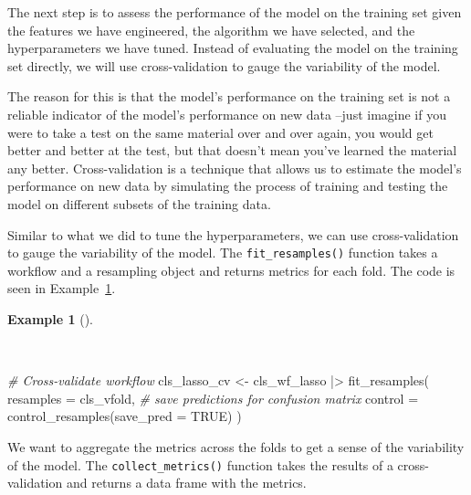 \documentclass[
  letterpaper,
]{latex/krantz}
\newenvironment{Shaded}{\begin{snugshade}}{\end{snugshade}}
\newcommand{\AttributeTok}[1]{\textcolor[rgb]{0.00,0.00,0.00}{#1}}
\newcommand{\CommentTok}[1]{\textcolor[rgb]{0.00,0.00,0.00}{\textit{#1}}}
\newcommand{\ConstantTok}[1]{\textcolor[rgb]{0.00,0.00,0.00}{#1}}
\newcommand{\FunctionTok}[1]{\textcolor[rgb]{0.00,0.00,0.00}{#1}}
\newcommand{\NormalTok}[1]{\textcolor[rgb]{0.00,0.00,0.00}{#1}}
\newcommand{\OtherTok}[1]{\textcolor[rgb]{0.00,0.00,0.00}{#1}}
\newcommand{\SpecialCharTok}[1]{\textcolor[rgb]{0.00,0.00,0.00}{#1}}
\theoremstyle{definition}
\newtheorem{example}{Example}[chapter]
\theoremstyle{remark}
\begin{document}
The next step is to assess the performance of the model on the training
set given the features we have engineered, the algorithm we have
selected, and the hyperparameters we have tuned. Instead of evaluating
the model on the training set directly, we will use cross-validation to
gauge the variability of the model.

The reason for this is that the model's performance on the training set
is not a reliable indicator of the model's performance on new data
--just imagine if you were to take a test on the same material over and
over again, you would get better and better at the test, but that
doesn't mean you've learned the material any better. Cross-validation is
a technique that allows us to estimate the model's performance on new
data by simulating the process of training and testing the model on
different subsets of the training data.

Similar to what we did to tune the hyperparameters, we can use
cross-validation to gauge the variability of the model. The
\texttt{fit\_resamples()} function takes a workflow and a resampling
object and returns metrics for each fold. The code is seen in
Example~\ref{exm-pda-class-tune-hyperparameters-evaluate-workflow-cv}.

\begin{example}[]\protect\hypertarget{exm-pda-class-tune-hyperparameters-evaluate-workflow-cv}{}\label{exm-pda-class-tune-hyperparameters-evaluate-workflow-cv}

~

\begin{Shaded}
\begin{Highlighting}[]
\CommentTok{\# Cross{-}validate workflow}
\NormalTok{cls\_lasso\_cv }\OtherTok{\textless{}{-}}
\NormalTok{  cls\_wf\_lasso }\SpecialCharTok{|\textgreater{}}
  \FunctionTok{fit\_resamples}\NormalTok{(}
    \AttributeTok{resamples =}\NormalTok{ cls\_vfold,}
    \CommentTok{\# save predictions for confusion matrix}
    \AttributeTok{control =} \FunctionTok{control\_resamples}\NormalTok{(}\AttributeTok{save\_pred =} \ConstantTok{TRUE}\NormalTok{)}
\NormalTok{  )}
\end{Highlighting}
\end{Shaded}

\end{example}

We want to aggregate the metrics across the folds to get a sense of the
variability of the model. The \texttt{collect\_metrics()} function takes
the results of a cross-validation and returns a data frame with the
metrics.
\end{document}
